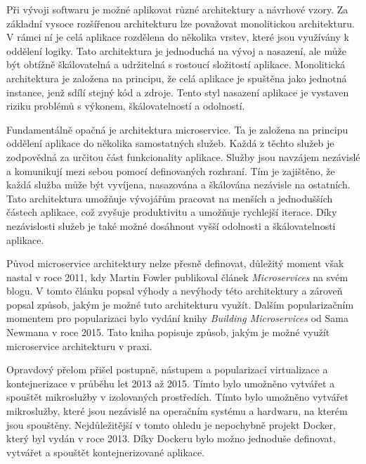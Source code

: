 

Při vývoji softwaru je možné aplikovat různé architektury a návrhové vzory. Za základní vysoce rozšířenou architekturu lze považovat monolitickou architekturu. V rámci ní je celá aplikace rozdělena do několika vrstev, které jsou využívány k oddělení logiky. Tato architektura je jednoduchá na vývoj a nasazení, ale může být obtížně škálovatelná a udržitelná s rostoucí složitostí aplikace. Monolitická architektura je založena na principu, že celá aplikace je spuštěna jako jednotná instance, jenž sdílí stejný kód a zdroje. Tento styl nasazení aplikace je vystaven riziku problémů s výkonem, škálovatelností a odolností.

Fundamentálně opačná je architektura microservice. Ta je založena na principu oddělení aplikace do několika samostatných služeb. Každá z těchto služeb je zodpovědná za určitou část funkcionality aplikace. Služby jsou navzájem nezávislé a komunikují mezi sebou pomocí definovaných rozhraní. Tím je zajištěno, že každá služba může být vyvíjena, nasazována a škálována nezávisle na ostatních. Tato architektura umožňuje vývojářům pracovat na menších a jednodušších částech aplikace, což zvyšuje produktivitu a umožňuje rychlejší iterace. Díky nezávislosti služeb je také možné dosáhnout vyšší odolnosti a škálovatelnosti aplikace. \cite{Martin2018}


Původ microservice architektury nelze přesně definovat, důležitý moment však nastal v roce 2011, kdy Martin Fowler publikoval článek \textit{Microservices} na svém blogu. V tomto článku popsal výhody a nevýhody této architektury a zároveň popsal způsob, jakým je možné tuto architekturu využít. Dalším popularizačním momentem pro popularizaci bylo vydání knihy \textit{Building Microservices} od Sama Newmana v roce 2015. Tato kniha popisuje způsob, jakým je možné využít microservice architekturu v praxi.

Opravdový přelom přišel postupně, nástupem a popularizací virtualizace a kontejnerizace v průběhu let 2013 až 2015. Tímto bylo umožněno vytvářet a spouštět mikroslužby v izolovaných prostředích. Tímto bylo umožněno vytvářet mikroslužby, které jsou nezávislé na operačním systému a hardwaru, na kterém jsou spouštěny. Nejdůležitější v tomto ohledu je nepochybně projekt Docker, který byl vydán v roce 2013. Díky Dockeru bylo možno jednoduše definovat, vytvářet a spouštět kontejnerizované aplikace. 

